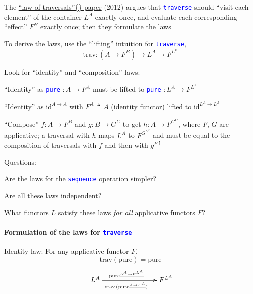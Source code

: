 \vspace{-0.2cm}The \href{https://arxiv.org/pdf/1202.2919.pdf}{\textquotedblleft law of traversals\textquotedblright\{\} paper}
(2012) argues that \texttt{\textcolor{blue}{\footnotesize{}traverse}}
should \textsf{``}visit each element\textsf{''} of the container $L^{A}$ exactly
once, and evaluate each corresponding \textsf{``}effect\textsf{''} $F^{B}$ exactly
once; then they formulate the laws

To derive the laws, use the \textsf{``}lifting\textsf{''} intuition for \texttt{\textcolor{blue}{\footnotesize{}traverse}},{\footnotesize{}
\[
\text{trav}:(A\rightarrow F^{B})\rightarrow L^{A}\rightarrow F^{L^{B}}
\]
}{\footnotesize\par}

{\footnotesize{}L}ook for \textsf{``}identity\textsf{''} and \textsf{``}composition\textsf{''} laws:

\textsf{``}Identity\textsf{''} as \texttt{\textcolor{blue}{\footnotesize{}pure}} $:A\rightarrow F^{A}$
must be lifted to \texttt{\textcolor{blue}{\footnotesize{}pure}} $:L^{A}\rightarrow F^{L^{A}}$

\textsf{``}Identity\textsf{''} as $\text{id}^{\underline{A\rightarrow A}}$ with $F^{A}\triangleq A$
(identity functor) lifted to $\text{id}^{\underline{L^{A}\rightarrow L^{A}}}$

\textsf{``}Compose\textsf{''} $f:A\rightarrow F^{B}$ and $g:B\rightarrow G^{C}$
to get $h:A\rightarrow F^{G^{C}}$, where $F$, $G$ are applicative;
a traversal with $h$ maps $L^{A}$ to $F^{G^{L^{C}}}$ and must be
equal to the composition of traversals with $f$ and then with $g^{F\uparrow}$

Questions:

Are the laws for the \texttt{\textcolor{blue}{\footnotesize{}sequence}}
operation simpler?

Are all these laws independent?

What functors $L$ satisfy these laws \emph{for all} applicative functors
$F$?


\paragraph{Formulation of the laws for \texttt{\textcolor{blue}{\footnotesize{}traverse}} }

\vspace{-0.15cm}Identity law: For any applicative functor $F$, 
\[
\text{trav}\left(\text{pure}\right)=\text{pure}
\]
\[
\xymatrix{\xyScaleY{0.2pc}\xyScaleX{3pc}\ L^{A}\ar[rr]\sp(0.45){\text{pure}^{\underline{L^{A}\rightarrow F^{L^{A}}}}}\ar[rr]\sb(0.45){\text{trav}\,(\text{pure}^{\underline{A\rightarrow F^{A}}})} &  & F^{L^{A}}}
\]


